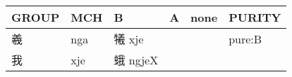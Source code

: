 \documentclass[14pt,a4paper]{scrartcl}
\begin{document}
\begin{longtable}[c]{@{}llllll@{}}
\toprule
\begin{minipage}[b]{0.14\columnwidth}\raggedright\strut
GROUP
\strut\end{minipage} &
\begin{minipage}[b]{0.14\columnwidth}\raggedright\strut
MCH
\strut\end{minipage} &
\begin{minipage}[b]{0.14\columnwidth}\raggedright\strut
B
\strut\end{minipage} &
\begin{minipage}[b]{0.14\columnwidth}\raggedright\strut
A
\strut\end{minipage} &
\begin{minipage}[b]{0.14\columnwidth}\raggedright\strut
none
\strut\end{minipage} &
\begin{minipage}[b]{0.14\columnwidth}\raggedright\strut
PURITY
\strut\end{minipage}\tabularnewline
\midrule
\endhead
\begin{minipage}[t]{0.14\columnwidth}\raggedright\strut
羲
\strut\end{minipage} &
\begin{minipage}[t]{0.14\columnwidth}\raggedright\strut
nga
\strut\end{minipage} &
\begin{minipage}[t]{0.14\columnwidth}\raggedright\strut
犧 xje
\strut\end{minipage} &
\begin{minipage}[t]{0.14\columnwidth}\raggedright\strut
\strut\end{minipage} &
\begin{minipage}[t]{0.14\columnwidth}\raggedright\strut
\strut\end{minipage} &
\begin{minipage}[t]{0.14\columnwidth}\raggedright\strut
pure:B
\strut\end{minipage}\tabularnewline
\begin{minipage}[t]{0.14\columnwidth}\raggedright\strut
我
\strut\end{minipage} &
\begin{minipage}[t]{0.14\columnwidth}\raggedright\strut
xje
\strut\end{minipage} &
\begin{minipage}[t]{0.14\columnwidth}\raggedright\strut
蛾 ngjeX
\strut\end{minipage} &
\begin{minipage}[t]{0.14\columnwidth}\raggedright\strut

\end{minipage}
\end{longtable}
\end{document}
